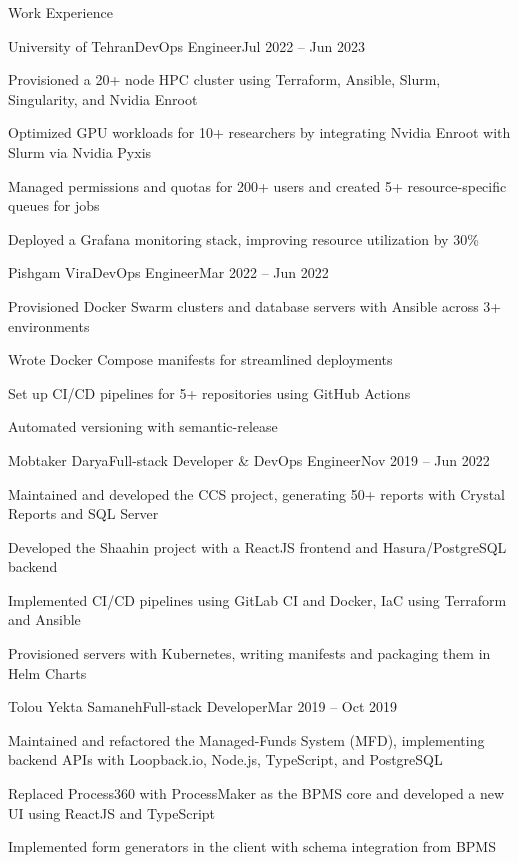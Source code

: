 \documentclass[]{main}
\begin{document}
\begin{section}{Work Experience}
\begin{subsection}{University of Tehran}{DevOps Engineer}{Jul 2022 -- Jun 2023}{}
     \item Provisioned a 20+ node HPC cluster using Terraform, Ansible, Slurm, Singularity, and Nvidia Enroot
     \item Optimized GPU workloads for 10+ researchers by integrating Nvidia Enroot with Slurm via Nvidia Pyxis
     \item Managed permissions and quotas for 200+ users and created 5+ resource-specific queues for jobs
     \item Deployed a Grafana monitoring stack, improving resource utilization by 30\%
 \end{subsection}
 \begin{subsection}{Pishgam Vira}{DevOps Engineer}{Mar 2022 -- Jun 2022}{}
     \item Provisioned Docker Swarm clusters and database servers with Ansible across 3+ environments
     \item Wrote Docker Compose manifests for streamlined deployments
     \item Set up CI/CD pipelines for 5+ repositories using GitHub Actions
     \item Automated versioning with semantic-release
 \end{subsection}
 \begin{subsection}{Mobtaker Darya}{Full-stack Developer \& DevOps Engineer}{Nov 2019 -- Jun 2022}{}
     \item Maintained and developed the CCS project, generating 50+ reports with Crystal Reports and SQL Server
     \item Developed the Shaahin project with a ReactJS frontend and Hasura/PostgreSQL backend
     \item Implemented CI/CD pipelines using GitLab CI and Docker, IaC using Terraform and Ansible
     \item Provisioned servers with Kubernetes, writing manifests and packaging them in Helm Charts
 \end{subsection}
 \begin{subsection}{Tolou Yekta Samaneh}{Full-stack Developer}{Mar 2019 -- Oct 2019}{}
     \item Maintained and refactored the Managed-Funds System (MFD), implementing backend APIs with Loopback.io, Node.js, TypeScript, and PostgreSQL
     \item Replaced Process360 with ProcessMaker as the BPMS core and developed a new UI using ReactJS and TypeScript
     \item Implemented form generators in the client with schema integration from BPMS

\end{subsection}
\end{section}
\end{document}
